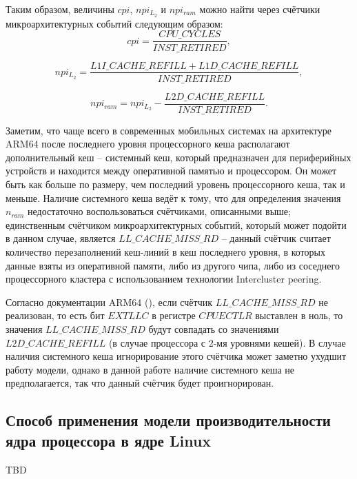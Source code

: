     Таким образом, величины $cpi$, $npi_{L_2}$ и $npi_{ram}$ можно найти через счётчики микроархитектурных
    событий следующим образом:
    \begin{equation}
        cpi = \frac{CPU\_CYCLES}{INST\_RETIRED},
    \end{equation}

    \begin{equation}
        npi_{L_2} = \frac{L1I\_CACHE\_REFILL + L1D\_CACHE\_REFILL}{INST\_RETIRED},
    \end{equation}

    \begin{equation}
        npi_{ram} = npi_{L_2} - \frac{L2D\_CACHE\_REFILL}{INST\_RETIRED}.
    \end{equation}

    Заметим, что чаще всего в современных мобильных системах на архитектуре ARM64 после последнего
    уровня процессорного кеша располагают дополнительный кеш -- системный кеш,
    который предназначен для периферийных устройств и находится между оперативной памятью и процессором.
    Он может быть как больше по размеру, чем последний уровень процессорного кеша, так и меньше.
    Наличие системного кеша ведёт к тому, что для определения значения $n_{ram}$ недостаточно
    воспользоваться счётчиками, описанными выше; единственным счётчиком микроархитектурных событий,
    который может подойти в данном случае, является $LL\_CACHE\_MISS\_RD$ -- данный счётчик считает
    количество перезаполнений кеш-линий в кеш последнего уровня, в которых данные взяты из оперативной памяти,
    либо из другого чипа, либо из соседнего процессорного кластера с использованием технологии Intercluster peering.

    Согласно документации ARM64 (\cite{ArmPerfAnalyses}), если счётчик $LL\_CACHE\_MISS\_RD$ не реализован,
    то есть бит $EXTLLC$ в регистре $CPUECTLR$ выставлен в ноль, то значения $LL\_CACHE\_MISS\_RD$
    будут совпадать со значениями $L2D\_CACHE\_REFILL$ (в случае процессора с 2-мя уровнями кешей).
    В случае наличия системного кеша игнорирование этого счётчика может заметно ухудшит
    работу модели, однако в данной работе наличие системного кеша не предполагается, так что данный
    счётчик будет проигнорирован.

\subsection{Способ применения модели производительности ядра процессора в ядре Linux}

    TBD



\newpage
